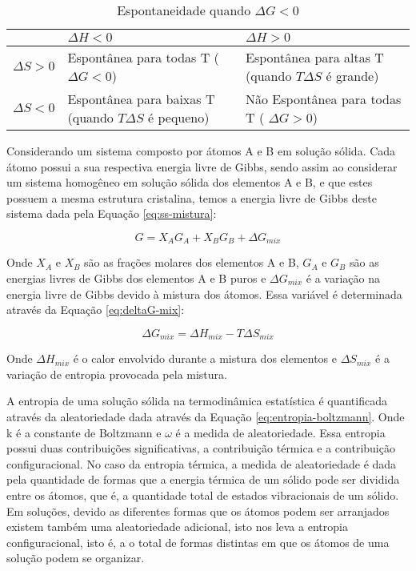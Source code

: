 \begin{table}[htb]
\centering
\caption{Espontaneidade quando $\Delta G < 0$ }
\begin{supertabular}{|m{2.0cm}|m{4.5cm}|m{4.5cm}|}
\hline
{  } &
{ $\Delta H < 0$ } &
{ $\Delta H > 0$ }\\\hline
{ $\Delta S > 0$ } &
{ Espontânea para todas T
( $\Delta G < 0$) } &
{ Espontânea para altas T
(quando $ T\Delta S$ é grande)
} \\\hline
{ $\Delta S < 0$ } &
{ Espontânea para baixas T
(quando $ T\Delta S$ é pequeno) } &
{ Não Espontânea para todas T
( $\Delta G > 0$) } \\\hline
\end{supertabular}
    \legend{}
    \label{quad:espontaneidade}
\end{table}

Considerando um sistema composto por átomos A e B em solução sólida. Cada átomo possui a sua respectiva energia livre de Gibbs, sendo assim ao considerar um sistema homogêneo em solução sólida dos elementos A e B, e que estes possuem a mesma estrutura cristalina, temos a energia livre de Gibbs deste sistema dada pela Equação \ref{eq:ss-mistura}:

\begin{equation} 
G = X_{A}G_{A} + X_{B}G_{B} + \Delta G_{mix}
\label{eq:ss-mistura}
\end{equation}

Onde $X_{A}$ e $X_{B}$ são as frações molares dos elementos A e B, $G_{A}$ e $G_{B}$ são as energias livres de Gibbs dos elementos A e B puros e $\Delta G_{mix}$ é a variação na energia livre de Gibbs devido à mistura dos átomos. Essa variável é determinada através da Equação \ref{eq:deltaG-mix}:

\begin{equation} 
\Delta G_{mix} = \Delta H_{mix} - T\Delta S_{mix}
\label{eq:deltaG-mix}
\end{equation}

Onde $\Delta H_{mix}$ é o calor envolvido durante a mistura dos elementos e $\Delta S_{mix}$ é a variação de entropia provocada pela mistura.

A entropia de uma solução sólida na termodinâmica estatística é quantificada através da aleatoriedade dada através da Equação \ref{eq:entropia-boltzmann}. Onde k é a constante de Boltzmann e $\omega$ é a medida de aleatoriedade. Essa entropia possui duas contribuições significativas, a contribuição térmica  e a contribuição configuracional. No caso da entropia térmica, a medida de aleatoriedade é dada pela quantidade de formas que a energia térmica de um sólido pode ser dividida entre os átomos, que é, a quantidade total de estados vibracionais de um sólido. Em soluções, devido as diferentes formas que os átomos podem ser arranjados existem também uma aleatoriedade adicional, isto nos leva a entropia configuracional, isto é, a o total de formas distintas em que os átomos de uma solução podem se organizar.


